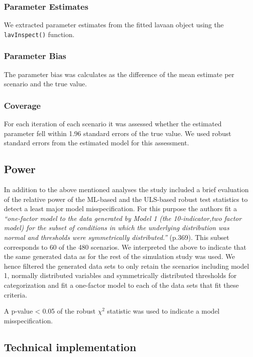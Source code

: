 \documentclass[10,a4paperpaper,]{article}
\begin{document}
\subsubsection{Parameter Estimates}

We extracted parameter estimates from the fitted lavaan object using the
\texttt{lavInspect()} function.

\subsubsection{Parameter Bias}

The parameter bias was calculates as the difference of the mean estimate
per scenario and the true value.

\subsubsection{Coverage}

For each iteration of each scenario it was assessed whether the
estimated parameter fell within 1.96 standard errors of the true value.
We used robust standard errors from the estimated model for this
assessment.

\subsection{Power}

In addition to the above mentioned analyses the study included a brief
evaluation of the relative power of the ML-based and the ULS-based
robust test statistics to detect a least major model misspecification.
For this purpose the authors fit a \emph{``one-factor model to the data
generated by Model 1 (the 10-indicator,two factor model) for the subset
of conditions in which the underlying distribution was normal and
thresholds were symmetrically distributed.''} (p.369). This subset
corresponds to 60 of the 480 scenarios. We interpreted the above to
indicate that the same generated data as for the rest of the simulation
study was used. We hence filtered the generated data sets to only retain
the scenarios including model 1, normally distributed variables and
symmetrically distributed thresholds for categorization and fit a
one-factor model to each of the data sets that fit these criteria.

A p-value \textless{} 0.05 of the robust \(\chi^2\) statistic was used
to indicate a model misspecification.

\subsection{Technical implementation}
\end{document}
